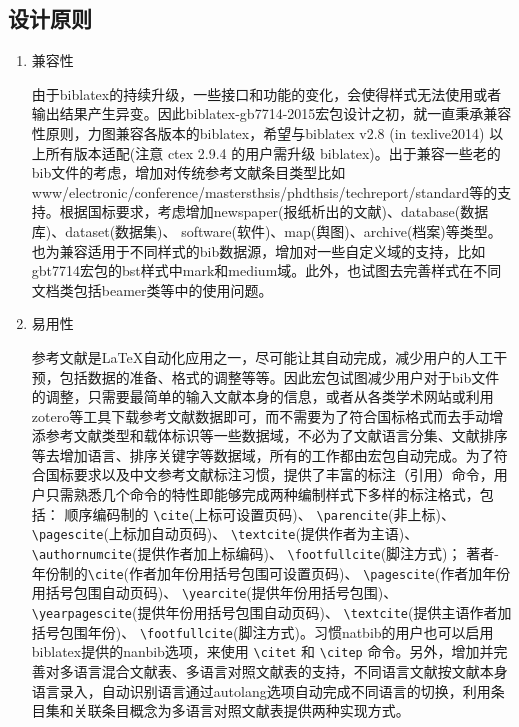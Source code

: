 \documentclass[11pt]{article} %
\begin{document}
\subsection{设计原则}

\begin{enumerate}
  \item 兼容性

由于biblatex的持续升级，一些接口和功能的变化，会使得样式无法使用或者输出结果产生异变。因此biblatex-gb7714-2015宏包设计之初，就一直秉承兼容性原则，力图兼容各版本的biblatex，希望与biblatex v2.8 (in texlive2014) 以上所有版本适配(注意 ctex 2.9.4 的用户需升级 biblatex)。出于兼容一些老的bib文件的考虑，增加对传统参考文献条目类型比如www/electronic/conference/mastersthsis/phdthsis/techreport/standard等的支持。根据国标要求，考虑增加newspaper(报纸析出的文献)、database(数据库)、dataset(数据集)、 software(软件)、map(舆图)、archive(档案)等类型。也为兼容适用于不同样式的bib数据源，增加对一些自定义域的支持，比如gbt7714宏包的bst样式中mark和medium域。此外，也试图去完善样式在不同文档类包括beamer类等中的使用问题。

  \item 易用性

参考文献是\LaTeX{}自动化应用之一，尽可能让其自动完成，减少用户的人工干预，包括数据的准备、格式的调整等等。因此宏包试图减少用户对于bib文件的调整，只需要最简单的输入文献本身的信息，或者从各类学术网站或利用zotero等工具下载参考文献数据即可，而不需要为了符合国标格式而去手动增添参考文献类型和载体标识等一些数据域，不必为了文献语言分集、文献排序等去增加语言、排序关键字等数据域，所有的工作都由宏包自动完成。为了符合国标要求以及中文参考文献标注习惯，提供了丰富的标注（引用）命令，用户只需熟悉几个命令的特性即能够完成两种编制样式下多样的标注格式，包括：
顺序编码制的 \verb|\cite|(上标可设置页码)、 \verb|\parencite|(非上标)、 \verb|\pagescite|(上标加自动页码)、 \verb|\textcite|(提供作者为主语)、 \verb|\authornumcite|(提供作者加上标编码)、 \verb|\footfullcite|(脚注方式)；
著者-年份制的\verb|\cite|(作者加年份用括号包围可设置页码)、 \verb|\pagescite|(作者加年份用括号包围自动页码)、
\verb|\yearcite|(提供年份用括号包围)、 \verb|\yearpagescite|(提供年份用括号包围自动页码)、
\verb|\textcite|(提供主语作者加括号包围年份)、 \verb|\footfullcite|(脚注方式)。习惯natbib的用户也可以启用biblatex提供的nanbib选项，来使用 \verb|\citet| 和 \verb|\citep| 命令。另外，增加并完善对多语言混合文献表、多语言对照文献表的支持，不同语言文献按文献本身语言录入，自动识别语言通过autolang选项自动完成不同语言的切换，利用条目集和关联条目概念为多语言对照文献表提供两种实现方式。



\end{enumerate}
\end{document}
